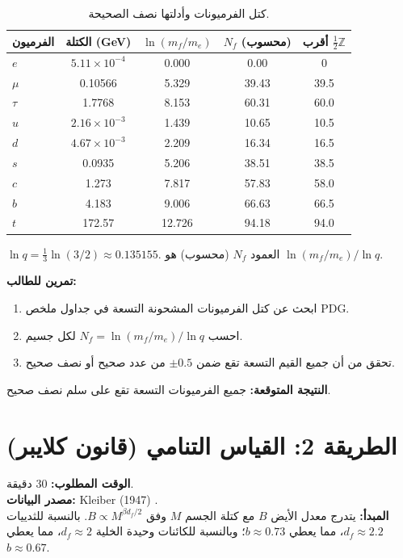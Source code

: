 \documentclass[12pt,a4paper]{article}
\begin{document}
	\begin{table}[H]
		\centering
		\caption{كتل الفرميونات وأدلتها نصف الصحيحة.}
		\label{tab:fermions}
		\begin{tabular}{l c c c c}
			\toprule
			الفرميون & الكتلة (GeV) & \(\ln(m_f/m_e)\) & \(N_f\) (محسوب) & أقرب \(\frac{1}{2}\mathbb{Z}\) \\
			\midrule
			\(e\)   & \(5.11\times10^{-4}\) & 0.000  & 0.00  & 0 \\
			\(\mu\)  & 0.10566 & 5.329  & 39.43 & 39.5 \\
			\(\tau\) & 1.7768  & 8.153  & 60.31 & 60.0 \\
			\(u\)   & \(2.16\times10^{-3}\) & 1.439  & 10.65 & 10.5 \\
			\(d\)   & \(4.67\times10^{-3}\) & 2.209  & 16.34 & 16.5 \\
			\(s\)   & 0.0935  & 5.206  & 38.51 & 38.5 \\
			\(c\)   & 1.273   & 7.817  & 57.83 & 58.0 \\
			\(b\)   & 4.183   & 9.006  & 66.63 & 66.5 \\
			\(t\)   & 172.57  & 12.726 & 94.18 & 94.0 \\
			\bottomrule
		\end{tabular}
		\par\smallskip
		\footnotesize
		\(\ln q = \frac{1}{3}\ln(3/2) \approx 0.135155\). العمود \(N_f\) (محسوب) هو \(\ln(m_f/m_e)/\ln q\).
	\end{table}
	
	\textbf{تمرين للطالب:}
	\begin{enumerate}[label=(\arabic*)]
		\item ابحث عن كتل الفرميونات المشحونة التسعة في جداول ملخص PDG.
		\item احسب \(N_f = \ln(m_f / m_e) / \ln q\) لكل جسيم.
		\item تحقق من أن جميع القيم التسعة تقع ضمن \(\pm 0.5\) من عدد صحيح أو نصف صحيح.
	\end{enumerate}
	
	\textbf{النتيجة المتوقعة:} جميع الفرميونات التسعة تقع على سلم نصف صحيح.
	
	\section{الطريقة 2: القياس التنامي (قانون كلايبر)}
	\label{sec:kleiber}
	
	\textbf{الوقت المطلوب:} 30 دقيقة.\\
	\textbf{مصدر البيانات:} Kleiber (1947) \cite{Kleiber1947}.\\
	\textbf{المبدأ:} يتدرج معدل الأيض \(B\) مع كتلة الجسم \(M\) وفق \(B \propto M^{\beta d_f/2}\). بالنسبة للثدييات \(d_f \approx 2.2\)، مما يعطي \(b \approx 0.73\)؛ وبالنسبة للكائنات وحيدة الخلية \(d_f \approx 2\)، مما يعطي \(b \approx 0.67\).
	
\end{document}
